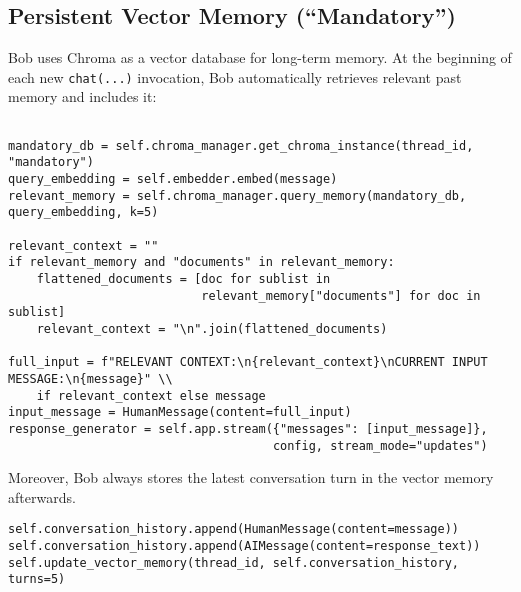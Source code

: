 \documentclass[11pt]{article}
\begin{document}
\subsection{Persistent Vector Memory (“Mandatory”)}
Bob uses Chroma as a vector database for long-term memory. 
At the beginning of each new \texttt{chat(...)} invocation, 
Bob automatically retrieves relevant past memory and includes it:
\begin{verbatim}

mandatory_db = self.chroma_manager.get_chroma_instance(thread_id, "mandatory")
query_embedding = self.embedder.embed(message)
relevant_memory = self.chroma_manager.query_memory(mandatory_db, query_embedding, k=5)

relevant_context = ""
if relevant_memory and "documents" in relevant_memory:
    flattened_documents = [doc for sublist in 
                           relevant_memory["documents"] for doc in sublist]
    relevant_context = "\n".join(flattened_documents)

full_input = f"RELEVANT CONTEXT:\n{relevant_context}\nCURRENT INPUT MESSAGE:\n{message}" \\
    if relevant_context else message
input_message = HumanMessage(content=full_input)
response_generator = self.app.stream({"messages": [input_message]},
                                     config, stream_mode="updates")

\end{verbatim}

Moreover, Bob always stores the latest conversation turn in the vector memory afterwards.

\begin{verbatim}
self.conversation_history.append(HumanMessage(content=message))
self.conversation_history.append(AIMessage(content=response_text))
self.update_vector_memory(thread_id, self.conversation_history, turns=5)
\end{verbatim}
\end{document}
